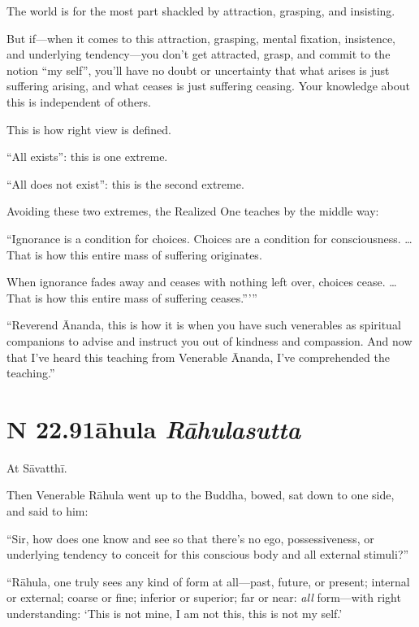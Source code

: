 \documentclass[12pt,openany]{book}%
\newcommand*{\suttatitleacronym}[1]{\smaller[2]{#1}\vspace*{.3em}}
\newcommand*{\suttatitletranslation}[1]{\linebreak{#1}}
\newcommand*{\suttatitleroot}[1]{\linebreak\smaller[2]\itshape{#1}}
\newcommand*{\tocacronym}[1]{\hspace*{-3.3em}{#1}\quad}
\newcommand*{\toctranslation}[1]{#1}
\newcommand*{\tocroot}[1]{(\textit{#1})}
\begin{document}
The world is for the most part shackled by attraction, grasping, and insisting. 

But if—when it comes to this attraction, grasping, mental fixation, insistence, and underlying tendency—you don’t get attracted, grasp, and commit to the notion “my self”, you’ll have no doubt or uncertainty that what arises is just suffering arising, and what ceases is just suffering ceasing. Your knowledge about this is independent of others. 

This is how right view is defined. 

“All exists”: this is one extreme. 

“All does not exist”: this is the second extreme. 

Avoiding these two extremes, the Realized One teaches by the middle way: 

“Ignorance is a condition for choices. Choices are a condition for consciousness. … That is how this entire mass of suffering originates. 

When ignorance fades away and ceases with nothing left over, choices cease. … That is how this entire mass of suffering ceases.”’” 

“Reverend Ānanda, this is how it is when you have such venerables as spiritual companions to advise and instruct you out of kindness and compassion. And now that I’ve heard this teaching from Venerable Ānanda, I’ve comprehended the teaching.” 

%
\section*{{\suttatitleacronym SN 22.91}{\suttatitletranslation Rāhula }{\suttatitleroot Rāhulasutta}}
\addcontentsline{toc}{section}{\tocacronym{SN 22.91} \toctranslation{Rāhula } \tocroot{Rāhulasutta}}

At \textsanskrit{Sāvatthī}. 

Then Venerable \textsanskrit{Rāhula} went up to the Buddha, bowed, sat down to one side, and said to him: 

“Sir, how does one know and see so that there’s no ego, possessiveness, or underlying tendency to conceit for this conscious body and all external stimuli?” 

“\textsanskrit{Rāhula}, one truly sees any kind of form at all—past, future, or present; internal or external; coarse or fine; inferior or superior; far or near: \emph{all} form—with right understanding: ‘This is not mine, I am not this, this is not my self.’ 
\end{document}

